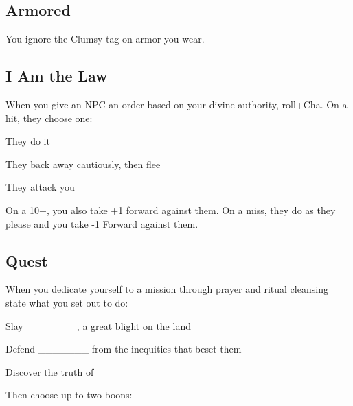            
\subsection{Armored}   
           

You ignore the Clumsy tag on armor you wear.

           
\subsection{I Am the Law}   
           

When you give an NPC an order based on your divine authority, roll+Cha. On a hit, they choose one:

           
\startitemize[1,packed]
             
\item They do it

             
\item They back away cautiously, then flee

             
\item They attack you

           
\stopitemize
           

On a 10+, you also take +1 forward against them. On a miss, they do as they please and you take -1 Forward against them.

           
\subsection{Quest}   
           

When you dedicate yourself to a mission through prayer and ritual cleansing state what you set out to do:

           
\startitemize[1,packed]
             
\item Slay \_\_\_\_\_\_\_, a great blight on the land

             
\item Defend \_\_\_\_\_\_\_ from the inequities that beset them

             
\item Discover the truth of \_\_\_\_\_\_\_

           
\stopitemize
           

Then choose up to two boons:

           
\startitemize[1,packed]
             
